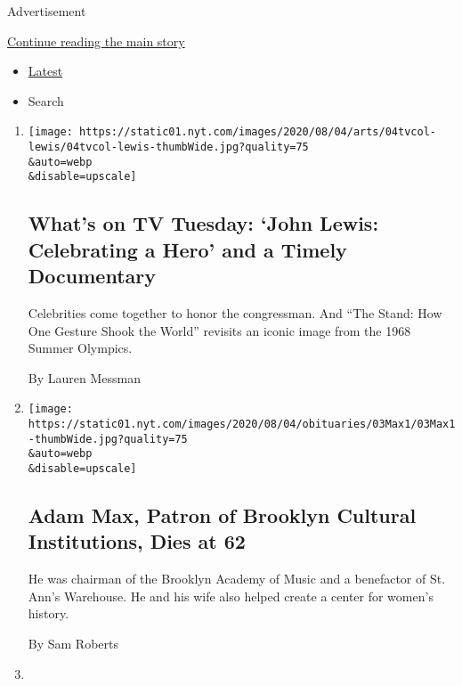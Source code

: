 Advertisement

\protect\hyperlink{after-mid1}{Continue reading the main story}

\begin{itemize}
\tightlist
\item
  \protect\hyperlink{stream-panel}{Latest}
\item
  Search
\end{itemize}

\begin{enumerate}
\def\labelenumi{\arabic{enumi}.}
\item
  \href{/2020/08/04/arts/television/whats-on-tv-tuesday.html}{}

  \texttt{[image: https://static01.nyt.com/images/2020/08/04/arts/04tvcol-lewis/04tvcol-lewis-thumbWide.jpg?quality=75\\\&auto=webp\\\&disable=upscale]}

  \hypertarget{whats-on-tv-tuesday-john-lewis-celebrating-a-hero-and-a-timely-documentary}{%
  \subsection{What's on TV Tuesday: `John Lewis: Celebrating a Hero' and
  a Timely
  Documentary}\label{whats-on-tv-tuesday-john-lewis-celebrating-a-hero-and-a-timely-documentary}}

  Celebrities come together to honor the congressman. And ``The Stand:
  How One Gesture Shook the World'' revisits an iconic image from the
  1968 Summer Olympics.

  By Lauren Messman
\item
  \href{/2020/08/03/arts/adam-max-patron-of-brooklyn-cultural-institutions-dies-at-62.html}{}

  \texttt{[image: https://static01.nyt.com/images/2020/08/04/obituaries/03Max1/03Max1-thumbWide.jpg?quality=75\\\&auto=webp\\\&disable=upscale]}

  \hypertarget{adam-max-patron-of-brooklyn-cultural-institutions-dies-at-62}{%
  \subsection{Adam Max, Patron of Brooklyn Cultural Institutions, Dies
  at
  62}\label{adam-max-patron-of-brooklyn-cultural-institutions-dies-at-62}}

  He was chairman of the Brooklyn Academy of Music and a benefactor of
  St. Ann's Warehouse. He and his wife also helped create a center for
  women's history.

  By Sam Roberts
\item
  \href{/2020/08/03/theater/virtual-theater.html}{}


\end{enumerate}
